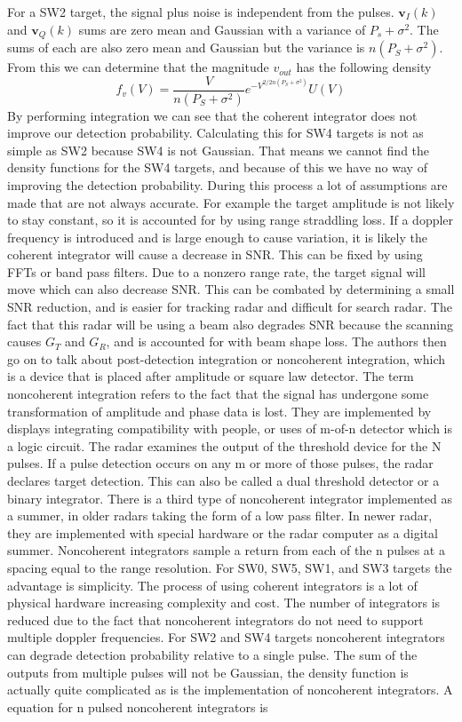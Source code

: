 \documentclass[12pt]{article}
\begin{document}
For a SW2 target, the signal plus noise is independent from the pulses. $\textbf{v}_{I}(k)$ and $\textbf{v}_{Q}(k)$ sums are zero mean and Gaussian with a variance of $P_s + \sigma^2$. The sums of each are also zero mean and Gaussian but the variance is $n(P_S + \sigma^2)$. From this we can determine that the magnitude $v_{out}$ has the following density
\begin{equation}
   f_v(V) = \frac{V}{n(P_S + \sigma^2)} e^{-V^{2/2n(P_S + \sigma^2)}} U(V)
\end{equation}
By performing integration we can see that the coherent integrator does not improve our detection probability. Calculating this for SW4 targets is not as simple as SW2 because SW4 is not Gaussian. That means we cannot find the density functions for the SW4 targets, and because of this we have no way of improving the detection probability. During this process a lot of assumptions are made that are not always accurate. For example the target amplitude is not likely to stay constant, so it is accounted for by using range straddling loss. If a doppler frequency is introduced and is large enough to cause variation, it is likely the coherent integrator will cause a decrease in SNR. This can be fixed by using FFTs or band pass filters. Due to a nonzero range rate, the target signal will move which can also decrease SNR. This can be combated by determining a small SNR reduction, and is easier for tracking radar and difficult for search radar. The fact that this radar will be using a beam also degrades SNR because the scanning causes $G_T$ and $G_R$, and is accounted for with beam shape loss.
The authors then go on to talk about post-detection integration or noncoherent integration, which is a device that is placed after amplitude or square law detector. The term noncoherent integration refers to the fact that the signal has undergone some transformation of amplitude and phase data is lost. They are implemented by displays integrating compatibility with people, or uses of m-of-n detector which is a logic circuit. The radar examines the output of the threshold device for the N pulses. If a pulse detection occurs on any m or more of those pulses, the radar declares target detection. This can also be called a dual threshold detector or a binary integrator. There is a third type of noncoherent integrator implemented as a summer, in older radars taking the form of a low pass filter. In newer radar, they are implemented with special hardware or the radar computer as a digital summer. Noncoherent integrators sample a return from each of the n pulses at a spacing equal to the range resolution. For SW0, SW5, SW1, and SW3 targets the advantage is simplicity. The process of using coherent integrators is a lot of physical hardware increasing complexity and cost. The number of integrators is reduced due to the fact that noncoherent integrators do not need to support multiple doppler frequencies. For SW2 and SW4 targets noncoherent integrators can degrade detection probability relative to a single pulse. The sum of the outputs from multiple pulses will not be Gaussian, the density function is actually quite complicated as is the implementation of noncoherent integrators. A equation for n pulsed noncoherent integrators is 
\end{document}
